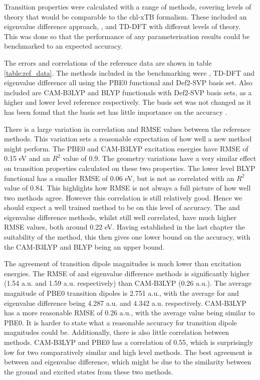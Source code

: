 Transition properties were calculated with a range of methods, covering levels of
theory that would be comparable to the chl-xTB formalism. These included an eigenvalue
difference approach, \dscf, and TD-DFT with different levels of theory. This was
done so that the performance of any parameterisation results could be benchmarked
to an expected accuracy.

The errors and correlations of the reference data are shown in table \ref{table:ref_data}.
The methods included  in the benchmarking were \dscf, TD-DFT and eigenvalue difference
all using the PBE0 functional and Def2-SVP basis set. Also included are CAM-B3LYP
and BLYP functionals with Def2-SVP basis sets, as a higher and lower level reference
respectively. The basis set was not changed as it has been found that the basis
set has little importance on the accuracy \cite{Stross2016}.

There is a large variation in correlation and RMSE values between the reference 
methods. This variation sets a reasonable expectation of how well a new method
might perform.
The PBE0 and CAM-B3LYP excitation energies have RMSE of 0.15 eV and an $R^2$ value
of 0.9. The geometry variations have a very similar effect on transition properties
calculated on these two properties. 
The lower level BLYP functional has a smaller RMSE of 0.06 eV, but is not as correlated 
with an $R^2$ value of 0.84. This highlights how RMSE is not always a full picture
of how well two methods agree. However this correlation is still relatively good.
Hence we should expect a well trained method to be on this level of accuracy. 
The \dscf and eigenvalue difference methods, whilst still well correlated, have
much higher RMSE values, both around 0.22 eV. Having established in the last chapter
the suitability of the \dscf method, this then gives one lower bound on the accuracy,
with the CAM-B3LYP and BLYP being an upper bound.

The agreement of transition dipole magnitudes is much lower than excitation energies.
The RMSE of \dscf and eigenvalue difference methods is significantly higher (1.54
a.u. and 1.59 a.u. respectively) than CAM-B3LYP (0.26 a.u.). The average magnitude
of PBE0 transition dipoles is 2.751 a.u., with the average for \dscf and eigenvalue
difference being 4.287 a.u. and 4.342 a.u. respectively. CAM-B3LYP has a more reasonable
RMSE of 0.26 a.u., with the average value being similar to PBE0. It is harder to 
state what a reasonable accuracy for transition dipole magnitudes could be.
Additionally, there is also little correlation between methods. CAM-B3LYP and PBE0
has a correlation of 0.55, which is surprisingly low for two comparatively similar
and high level methods. The best agreement is between \dscf and eigenvalue difference,
which might be due to the similarity between the ground and excited states from 
these two methods.

